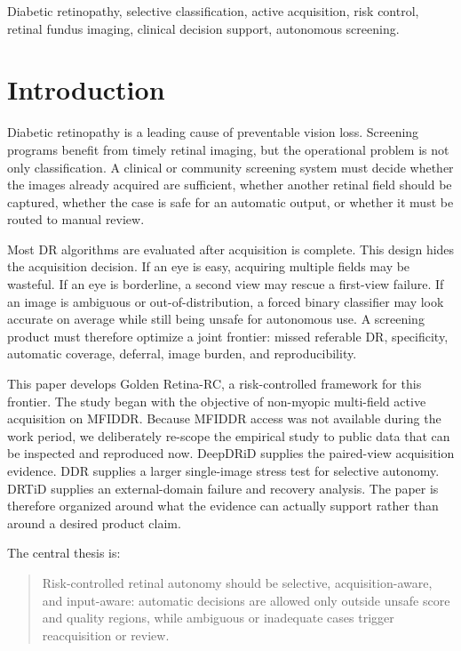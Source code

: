 \documentclass[journal]{IEEEtran}
\begin{document}
\begin{IEEEkeywords}
Diabetic retinopathy, selective classification, active acquisition, risk control, retinal fundus imaging, clinical decision support, autonomous screening.
\end{IEEEkeywords}

\section{Introduction}
Diabetic retinopathy is a leading cause of preventable vision loss. Screening programs benefit from timely retinal imaging, but the operational problem is not only classification. A clinical or community screening system must decide whether the images already acquired are sufficient, whether another retinal field should be captured, whether the case is safe for an automatic output, or whether it must be routed to manual review.

Most DR algorithms are evaluated after acquisition is complete. This design hides the acquisition decision. If an eye is easy, acquiring multiple fields may be wasteful. If an eye is borderline, a second view may rescue a first-view failure. If an image is ambiguous or out-of-distribution, a forced binary classifier may look accurate on average while still being unsafe for autonomous use. A screening product must therefore optimize a joint frontier: missed referable DR, specificity, automatic coverage, deferral, image burden, and reproducibility.

This paper develops Golden Retina-RC, a risk-controlled framework for this frontier. The study began with the objective of non-myopic multi-field active acquisition on MFIDDR. Because MFIDDR access was not available during the work period, we deliberately re-scope the empirical study to public data that can be inspected and reproduced now. DeepDRiD supplies the paired-view acquisition evidence. DDR supplies a larger single-image stress test for selective autonomy. DRTiD supplies an external-domain failure and recovery analysis. The paper is therefore organized around what the evidence can actually support rather than around a desired product claim.

The central thesis is:
\begin{quote}
Risk-controlled retinal autonomy should be selective, acquisition-aware, and input-aware: automatic decisions are allowed only outside unsafe score and quality regions, while ambiguous or inadequate cases trigger reacquisition or review.
\end{quote}
\end{document}
